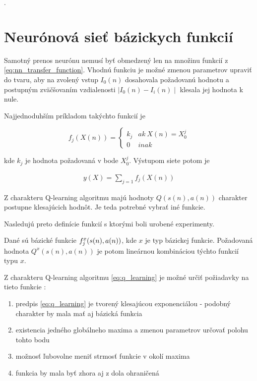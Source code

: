 .

\section{Neurónová sieť bázickych funkcií}

Samotný prenos neurónu nemusí byť obmedzený len na množinu funkcií z \ref{eq:nn_transfer_function}.
Vhodnú funkciu je možné zmenou parametrov upraviť do tvaru, aby na zvolený
vstup $I_0(n)$ dosahovala požadovanú hodnotu a postupným zväčšovaním
vzdialenosti $\mid I_0(n) - I_i(n) \mid$ klesala jej hodnota k nule.

Najjednoduhším príkladom takýchto funkcií  je


\begin{equation}
f_j(X(n)) =
\left\{
	\begin{array}{ll}
		k_j  & ak \ X(n) = X^j_0 \\
		0 & inak
	\end{array}
\right.
\label{eq:bfnn_simple}
\end{equation}

kde $k_j$ je hodnota požadovaná v bode $X^j_0$. Výstupom siete potom je

\begin{align}
y(X) = \sum\limits_{j=1} f_j(X(n))
\label{eq:bfnn_simple_res}
\end{align}

Z charakteru Q-learning algoritmu majú hodnoty $Q(s(n),a(n))$ charakter
postupne klesajúcich hodnôt. Je teda potrebné vybrať iné funkcie.

Nasledujú preto definície funkcií s ktorými boli urobené experimenty.

Dané sú bázické funkcie $f_j^x(\boldmath{s(n), a(n)})$, kde $x$ je typ bázickej funkcie.
Požadovaná hodnota $Q^x(s(n), a(n))$ je potom lineárnou kombináciou týchto funkcií typu $x$.

Z charakteru Q-learning algoritmu \ref{eq:q_learning} je možné určiť požiadavky na
tieto funkcie :

\begin{enumerate}
\item predpis \ref{eq:q_learning} je tvorený klesajúcou exponenciálou - podobný charakter by mala mať aj bázická funkcia
\item existencia jedného globálneho maxima a zmenou parametrov určovať polohu tohto bodu
\item možnosť ľubovolne meniť strmosť funkcie v okolí maxima
\item funkcia by mala byť zhora aj z dola ohraničená
\end{enumerate}

